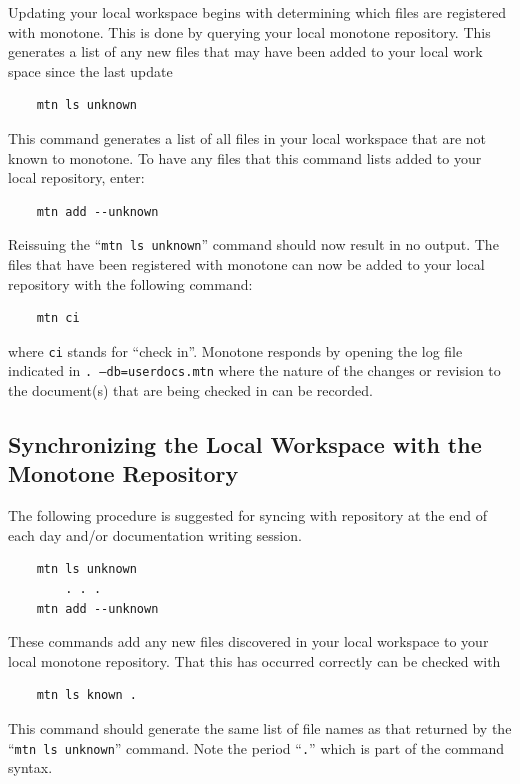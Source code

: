 \documentclass[12pt]{article}
\begin{document}
Updating your local workspace begins with determining which files are registered with monotone. This is done by querying your local monotone repository. This generates a list of any new files that may have been added to your local work space since the last update
\begin{verbatim}
    mtn ls unknown
\end{verbatim}
This command generates a list of all files in your local workspace that are not known to monotone. To have any files that this command lists added to your local repository, enter:
\begin{verbatim}
    mtn add --unknown
\end{verbatim}
Reissuing the ``{\tt mtn ls unknown}'' command should now result in no output. The files that have been registered with monotone can now be added to your local repository with the following command:
\begin{verbatim}
    mtn ci
\end{verbatim}
where {\tt ci} stands for ``check in''. Monotone responds by opening the log file indicated in {\tt .\,--db=userdocs.mtn} where the nature of the changes or revision to the document(s) that are being checked in can be recorded.

\subsection*{Synchronizing the Local Workspace with the Monotone Repository}

The following procedure is suggested for syncing with repository at the end of each day and/or documentation writing session.

\begin{verbatim}
    mtn ls unknown
        . . .
    mtn add --unknown
\end{verbatim}
These commands add any new files discovered in your local workspace to your local monotone repository. That this has occurred correctly can be checked with
\begin{verbatim}
    mtn ls known .
\end{verbatim}
This command should generate the same list of file names as that returned by the ``{\tt mtn ls unknown}'' command. Note the period ``{\tt .}'' which is part of the command syntax.
\end{document}
